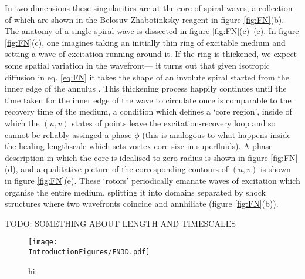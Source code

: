 In two dimensions these singularities are at the core of spiral waves, a collection of which are shown in the Belosuv-Zhabotinksky reagent in figure \ref{fig:FN}(b). The anatomy of a single spiral wave is dissected in figure \ref{fig:FN}(c)--(e). In figure \ref{fig:FN}(c), one imagines taking an initially thin ring of excitable medium and setting a wave of excitation running around it. If the ring is thickened, we expect some spatial variation in the wavefront--- it turns out that given isotropic diffusion in eq. \ref{eq:FN} it takes the shape of an involute spiral started from the inner edge of the annulus \citep{WinfreeBook}. This thickening process happily continues until the time taken for the inner edge of the wave to circulate once is comparable to the recovery time of the medium, a condition which defines a `core region', inside of which the $(u,v)$ states of points leave the excitation-recovery loop and so cannot be reliably assinged a phase $\phi$ (this is analogous to what happens inside the healing lengthscale which sets vortex core size in superfluids). A phase description in which the core is idealised to zero radius is shown in figure \ref{fig:FN}(d), and a qualitative picture of the corresponding contours of $(u,v)$ is shown in figure \ref{fig:FN}(e). These `rotors' periodically emanate waves of excitation which organise the entire medium, splitting it into domains separated by shock structures where two wavefronts coincide and annhiliate (figure \ref{fig:FN}(b)).

TODO: SOMETHING ABOUT LENGTH AND TIMESCALES

\begin{figure}[htbp]
\centering
\texttt{[image: \\IntroductionFigures/FN3D.pdf]}
\caption{hi }
\label{fig:FN3D}
\end{figure}

